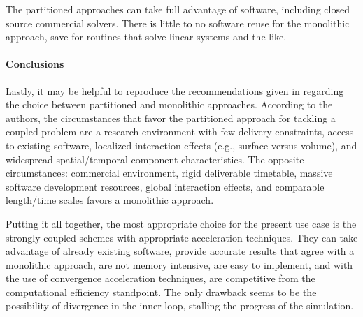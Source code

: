 The partitioned approaches can take full advantage of software, including closed source commercial solvers.
There is little to no software reuse for the monolithic approach, save for routines that solve linear systems and the like.

\paragraph{Conclusions}

Lastly, it may be helpful to reproduce the recommendations given in \cite{felippa_partitioned_2001} regarding the choice between partitioned and monolithic approaches.
According to the authors, the circumstances that favor the partitioned approach for tackling a coupled problem are a research environment with few delivery constraints, access to existing software, localized interaction effects (e.g., surface versus volume), and widespread spatial/temporal component characteristics.
The opposite circumstances:        commercial environment,        rigid deliverable timetable,        massive software development resources,        global interaction effects, and comparable length/time scales favors a monolithic approach.

Putting it all together, the most appropriate choice for the present use case is the strongly coupled schemes with appropriate acceleration techniques.
They can take advantage of already existing software, provide accurate results that agree with a monolithic approach, are not memory intensive, are easy to implement, and with the use of convergence acceleration techniques, are competitive from the computational efficiency standpoint.
The only drawback seems to be the possibility of divergence in the inner loop, stalling the progress of the simulation.


